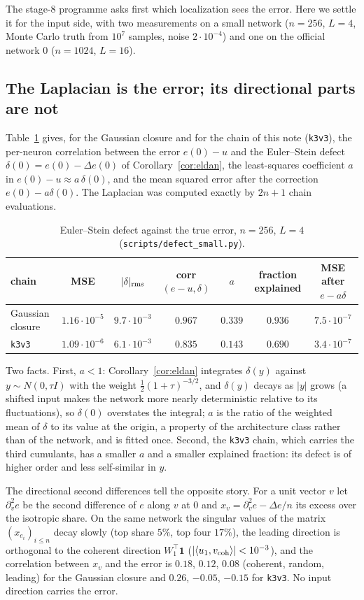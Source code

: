 \label{sec:capacity}
The stage-8 programme asks first which localization sees the error. Here we settle it for the input side, with
two measurements on a small network ($n=256$, $L=4$, Monte Carlo truth from $10^7$ samples, noise $2\cdot10^{-4}$)
and one on the official network $0$ ($n=1024$, $L=16$).

\subsection{The Laplacian is the error; its directional parts are not}
Table~\ref{tab:defect-small} gives, for the Gaussian closure and for the chain of this note (\texttt{k3v3}), the
per-neuron correlation between the error $e(0)-u$ and the Euler--Stein defect $\delta(0)=e(0)-\Delta e(0)$ of
Corollary~\ref{cor:eldan}, the least-squares coefficient $a$ in $e(0)-u\approx a\,\delta(0)$, and the mean squared
error after the correction $e(0)-a\delta(0)$. The Laplacian was computed exactly by $2n+1$ chain evaluations.
\begin{table}[h]\centering\small
\begin{tabular}{lcccccc}\toprule
chain & MSE & $|\delta|_{\rm rms}$ & corr$(e-u,\delta)$ & $a$ & fraction explained & MSE after $e-a\delta$\\\midrule
Gaussian closure & $1.16\cdot10^{-5}$ & $9.7\cdot10^{-3}$ & $0.967$ & $0.339$ & $0.936$ & $7.5\cdot10^{-7}$\\
\texttt{k3v3}    & $1.09\cdot10^{-6}$ & $6.1\cdot10^{-3}$ & $0.835$ & $0.143$ & $0.690$ & $3.4\cdot10^{-7}$\\
\bottomrule\end{tabular}
\caption{Euler--Stein defect against the true error, $n=256$, $L=4$ (\texttt{scripts/defect\_small.py}).}
\label{tab:defect-small}
\end{table}
Two facts. First, $a<1$: Corollary~\ref{cor:eldan} integrates $\delta(y)$ against $y\sim N(0,\tau I)$ with the
weight $\tfrac12(1+\tau)^{-3/2}$, and $\delta(y)$ decays as $|y|$ grows (a shifted input makes the network more
nearly deterministic relative to its fluctuations), so $\delta(0)$ overstates the integral; $a$ is the ratio of
the weighted mean of $\delta$ to its value at the origin, a property of the architecture class rather than of the
network, and is fitted once. Second, the \texttt{k3v3} chain, which carries the third cumulants, has a smaller
$a$ and a smaller explained fraction: its defect is of higher order and less self-similar in $y$.

The directional second differences tell the opposite story. For a unit vector $v$ let $\partial_v^2e$ be the
second difference of $e$ along $v$ at $0$ and $x_v=\partial_v^2e-\Delta e/n$ its excess over the isotropic share.
On the same network the singular values of the matrix $(x_{e_i})_{i\le n}$ decay slowly (top share $5\%$, top four
$17\%$), the leading direction is orthogonal to the coherent direction $W_1^{\top}\mathbf 1$ ($|\langle u_1,
v_{\rm coh}\rangle|<10^{-3}$), and the correlation between $x_v$ and the error is $0.18$, $0.12$, $0.08$
(coherent, random, leading) for the Gaussian closure and $0.26$, $-0.05$, $-0.15$ for \texttt{k3v3}. No input
direction carries the error.

